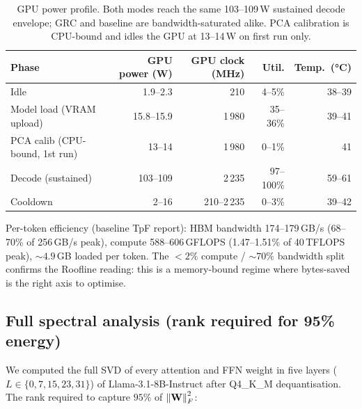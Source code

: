 \documentclass[11pt]{article}
\begin{document}
\begin{table}[h]\centering\footnotesize
\caption{GPU power profile. Both modes reach the same 103--109\,W sustained
decode envelope; GRC and baseline are bandwidth-saturated alike. PCA
calibration is CPU-bound and idles the GPU at 13--14\,W on first run only.}
\begin{tabular}{@{}lrrrr@{}}
\toprule
\textbf{Phase} & \textbf{GPU power (W)} & \textbf{GPU clock (MHz)} & \textbf{Util.} & \textbf{Temp.\ (°C)}\\
\midrule
Idle                       & 1.9--2.3   & 210         & 4--5\%     & 38--39\\
Model load (VRAM upload)   & 15.8--15.9 & 1\,980      & 35--36\%   & 39--41\\
PCA calib (CPU-bound, 1st run)
                           & 13--14     & 1\,980      & 0--1\%     & 41\\
Decode (sustained)         & 103--109   & 2\,235      & 97--100\%  & 59--61\\
Cooldown                   & 2--16      & 210--2\,235 & 0--3\%     & 39--42\\
\bottomrule
\end{tabular}
\end{table}

Per-token efficiency (baseline TpF report): HBM bandwidth
174--179\,GB/s (68--70\% of 256\,GB/s peak), compute 588--606\,GFLOPS
(1.47--1.51\% of 40\,TFLOPS peak), $\sim 4.9$\,GB loaded per token.
The $<\!2\%$ compute / $\sim\!70\%$ bandwidth split confirms the
Roofline reading: this is a memory-bound regime where bytes-saved is the
right axis to optimise.

\subsection{Full spectral analysis (rank required for 95\% energy)}

We computed the full SVD of every attention and FFN weight in five layers
($L\in\{0,7,15,23,31\}$) of Llama-3.1-8B-Instruct after Q4\_K\_M
dequantisation. The rank required to capture $95\%$ of $\left\lVert \mathbf{W} \right\rVert_F^2$:
\end{document}
